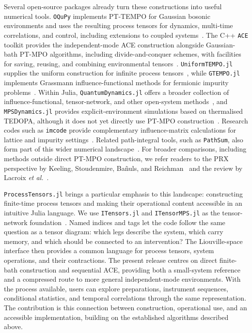 Several open-source packages already turn these constructions into useful numerical tools.
\texttt{OQuPy} implements PT-TEMPO for Gaussian bosonic environments and uses the resulting process tensors for dynamics, multi-time correlations, and control, including extensions to coupled systems~\cite{Fux2024}.
The C++ \texttt{ACE} toolkit provides the independent-mode ACE construction alongside Gaussian-bath PT-MPO algorithms, including divide-and-conquer schemes, with facilities for saving, reusing, and combining environmental tensors~\cite{CygorekGauger2024}.
\texttt{UniformTEMPO.jl} supplies the uniform construction for infinite process tensors~\cite{Link2024Infinite,UniformTEMPOSoftware}, while \texttt{GTEMPO.jl} implements Grassmann influence-functional methods for fermionic impurity problems~\cite{Chen2024GTEMPO,XuGuoChen2024GTEMPO,GTEMPOSoftware}.
Within Julia, \texttt{QuantumDynamics.jl} offers a broader collection of influence-functional, tensor-network, and other open-system methods~\cite{Bose2023}, and \texttt{MPSDynamics.jl} provides explicit-environment simulations based on thermalised TEDOPA, although it does not yet directly use PT-MPO construction~\cite{Lacroix2024}.
Research codes such as \texttt{imcode} provide complementary influence-matrix calculations for lattice and impurity settings~\cite{IMCodeSoftware}.
Related path-integral tools, such as \texttt{PathSum}, also form part of this wider numerical landscape~\cite{Kundu2023PathSum}.
For broader comparisons, including methods outside direct PT-MPO construction, we refer readers to the PRX perspective by Keeling, Stoudenmire, Ba\~nuls, and Reichman~\cite{Keeling2026} and the review by Lacroix \textit{et al.}~\cite{LacroixReview2026}.

\texttt{ProcessTensors.jl} brings a particular emphasis to this landscape: constructing finite-time process tensors and making their operational content accessible in an intuitive Julia language.
We use \texttt{ITensors.jl} and \texttt{ITensorMPS.jl} as the tensor-network foundation~\cite{Fishman2022}.
Named indices and tags let the code follow the same question as a tensor diagram: which legs describe the system, which carry memory, and which should be connected to an intervention?
The Liouville-space interface then provides a common language for process tensors, system operations, and their contractions.
The present release centres on direct finite-bath construction and sequential ACE, providing both a small-system reference and a compressed route to more general independent-mode environments.
With the process available, users can explore preparations, instrument sequences, conditional statistics, and temporal correlations through the same representation.
The contribution is this connection between construction, operational use, and an accessible implementation, building on the established algorithms described above.

